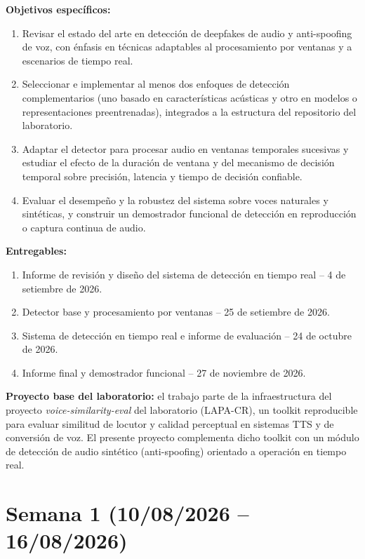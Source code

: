 \documentclass[11pt]{article}
\newcommand{\campo}[1]{\textbf{#1}}
\begin{document}
\vspace{0.3cm}
\campo{Objetivos específicos:}
\begin{enumerate}[label=\arabic*.]
\item Revisar el estado del arte en detección de deepfakes de audio y anti-spoofing de voz, con énfasis en técnicas adaptables al procesamiento por ventanas y a escenarios de tiempo real.
\item Seleccionar e implementar al menos dos enfoques de detección complementarios (uno basado en características acústicas y otro en modelos o representaciones preentrenadas), integrados a la estructura del repositorio del laboratorio.
\item Adaptar el detector para procesar audio en ventanas temporales sucesivas y estudiar el efecto de la duración de ventana y del mecanismo de decisión temporal sobre precisión, latencia y tiempo de decisión confiable.
\item Evaluar el desempeño y la robustez del sistema sobre voces naturales y sintéticas, y construir un demostrador funcional de detección en reproducción o captura continua de audio.
\end{enumerate}

\vspace{0.3cm}
\campo{Entregables:}
\begin{enumerate}[label=\arabic*.]
\item Informe de revisión y diseño del sistema de detección en tiempo real -- 4 de setiembre de 2026.
\item Detector base y procesamiento por ventanas -- 25 de setiembre de 2026.
\item Sistema de detección en tiempo real e informe de evaluación -- 24 de octubre de 2026.
\item Informe final y demostrador funcional -- 27 de noviembre de 2026.
\end{enumerate}

\vspace{0.3cm}
\campo{Proyecto base del laboratorio:} el trabajo parte de la infraestructura del proyecto \textit{voice-similarity-eval} del laboratorio (LAPA-CR), un toolkit reproducible para evaluar similitud de locutor y calidad perceptual en sistemas TTS y de conversión de voz. El presente proyecto complementa dicho toolkit con un módulo de detección de audio sintético (anti-spoofing) orientado a operación en tiempo real.

\newpage

\section{Semana 1 (10/08/2026 -- 16/08/2026)}
\end{document}
